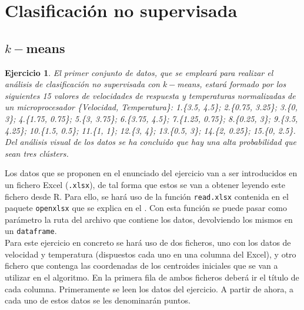 \documentclass[12pt]{report}\usepackage[]{graphicx}\usepackage[dvipsnames]{xcolor}
\newtheorem{exercise}{Ejercicio}[section]
\begin{document}
		 \section{Clasificación no supervisada}
		 
		 	\subsection{$k-$means}
		 
				 \begin{exercise}\label{ex:kmeans}
					 	El primer conjunto de datos, que se empleará para realizar el análisis de clasificación no supervisada con $k-$means, estará formado por los siguientes 15 valores de velocidades de respuesta y temperaturas normalizadas de un microprocesador \{Velocidad, Temperatura\}: 1.\{3.5, 4.5\}; 2.\{0.75, 3.25\}; 3.\{0, 3\}; 4.\{1.75, 0.75\}; 5.\{3, 3.75\}; 6.\{3.75, 4.5\}; 7.\{1.25, 0.75\}; 8.\{0.25, 3\}; 9.\{3.5, 4.25\}; 10.\{1.5, 0.5\}; 11.\{1, 1\}; 12.\{3, 4\}; 13.\{0.5, 3\}; 14.\{2, 0.25\}; 15.\{0, 2.5\}. Del análisis visual de los datos se ha concluido que hay una alta probabilidad que sean tres clústers.
				 \end{exercise}
				 
				 Los datos que se proponen en el enunciado del ejercicio van a ser introducidos en un fichero Excel (\texttt{.xlsx}), de tal forma que estos se van a obtener leyendo este fichero desde R. Para ello, se hará uso de la función \texttt{read.xlsx} contenida en el paquete \texttt{openxlsx} que se explica en el . Con esta función se puede pasar como parámetro la ruta del archivo que contiene los datos, devolviendo los mismos en un \texttt{dataframe}.\\
				 
				 Para este ejercicio en concreto se hará uso de dos ficheros, uno con los datos de velocidad y temperatura (dispuestos cada uno en una columna del Excel), y otro fichero que contenga las coordenadas de los centroides iniciales que se van a utilizar en el algoritmo. En la primera fila de ambos ficheros deberá ir el título de cada columna. Primeramente se leen los datos del ejercicio. A partir de ahora, a cada uno de estos datos se les denominarán puntos.
				 
\end{document}

